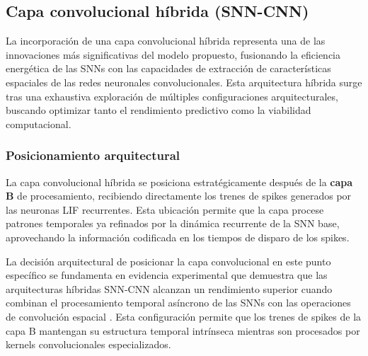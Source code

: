 


    
    
\subsection{Capa convolucional híbrida (SNN-CNN)}

La incorporación de una capa convolucional híbrida representa una de las innovaciones más significativas del modelo propuesto, fusionando la eficiencia energética de las SNNs con las capacidades de extracción de características espaciales de las redes neuronales convolucionales. Esta arquitectura híbrida surge tras una exhaustiva exploración de múltiples configuraciones arquitecturales, buscando optimizar tanto el rendimiento predictivo como la viabilidad computacional.

\subsubsection {Posicionamiento arquitectural}

La capa convolucional híbrida se posiciona estratégicamente después de la \textbf{capa B} de procesamiento, recibiendo directamente los trenes de spikes generados por las neuronas LIF recurrentes. Esta ubicación permite que la capa procese patrones temporales ya refinados por la dinámica recurrente de la SNN base, aprovechando la información codificada en los tiempos de disparo de los spikes.

La decisión arquitectural de posicionar la capa convolucional en este punto específico se fundamenta en evidencia experimental que demuestra que las arquitecturas híbridas SNN-CNN alcanzan un rendimiento superior cuando combinan el procesamiento temporal asíncrono de las SNNs con las operaciones de convolución espacial \cite{sanaullah_hybrid_2024}. Esta configuración permite que los trenes de spikes de la capa B mantengan su estructura temporal intrínseca mientras son procesados por kernels convolucionales especializados.


